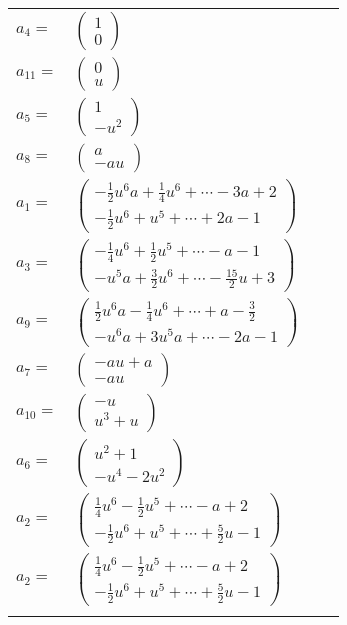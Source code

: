 \documentclass[1p]{elsarticle_modified}
\theoremstyle{definition}
\begin{document}
\begin{tabular}{m{7pt} m{180pt} m{7pt} m{180pt} }
\flushright $a_{4}=$&$\begin{pmatrix}1\\0\end{pmatrix}$ \\
\flushright $a_{11}=$&$\begin{pmatrix}0\\u\end{pmatrix}$ \\
\flushright $a_{5}=$&$\begin{pmatrix}1\\- u^2\end{pmatrix}$ \\
\flushright $a_{8}=$&$\begin{pmatrix}a\\- a u\end{pmatrix}$ \\
\flushright $a_{1}=$&$\begin{pmatrix}-\frac{1}{2} u^6 a+\frac{1}{4} u^6+\cdots-3 a+2\\-\frac{1}{2} u^6+u^5+\cdots+2 a-1\end{pmatrix}$ \\
\flushright $a_{3}=$&$\begin{pmatrix}-\frac{1}{4} u^6+\frac{1}{2} u^5+\cdots- a-1\\- u^5 a+\frac{3}{2} u^6+\cdots-\frac{15}{2} u+3\end{pmatrix}$ \\
\flushright $a_{9}=$&$\begin{pmatrix}\frac{1}{2} u^6 a-\frac{1}{4} u^6+\cdots+a-\frac{3}{2}\\- u^6 a+3 u^5 a+\cdots-2 a-1\end{pmatrix}$ \\
\flushright $a_{7}=$&$\begin{pmatrix}- a u+a\\- a u\end{pmatrix}$ \\
\flushright $a_{10}=$&$\begin{pmatrix}- u\\u^3+u\end{pmatrix}$ \\
\flushright $a_{6}=$&$\begin{pmatrix}u^2+1\\- u^4-2 u^2\end{pmatrix}$ \\
\flushright $a_{2}=$&$\begin{pmatrix}\frac{1}{4} u^6-\frac{1}{2} u^5+\cdots- a+2\\-\frac{1}{2} u^6+u^5+\cdots+\frac{5}{2} u-1\end{pmatrix}$\\ \flushright $a_{2}=$&$\begin{pmatrix}\frac{1}{4} u^6-\frac{1}{2} u^5+\cdots- a+2\\-\frac{1}{2} u^6+u^5+\cdots+\frac{5}{2} u-1\end{pmatrix}$\\&\end{tabular}
\end{document}

